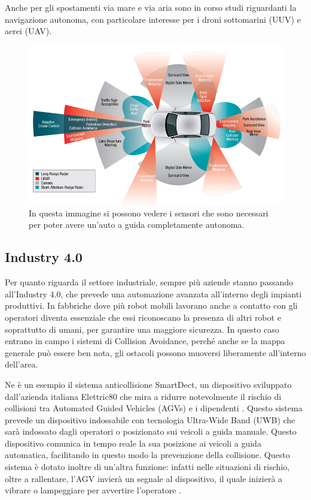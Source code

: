 \documentclass[Lau, binding=0.6cm, oneside]{sapthesis}
\begin{document}
Anche per gli spostamenti via mare e via aria sono in corso studi riguardanti la navigazione autonoma, con particolare interesse per i droni sottomarini (UUV) e aerei (UAV).

\begin{figure}[H]
    \centering
    \includegraphics[width=12.5cm]{driverless_car.png}
    \caption{In questa immagine si possono vedere i sensori che sono necessari per poter avere un'auto a guida completamente autonoma.}
    \label{fig:driverless_car}
\end{figure}

\subsection{Industry 4.0}
Per quanto riguarda il settore industriale, sempre più aziende stanno passando all'Industry 4.0, che prevede una automazione avanzata all'interno degli impianti produttivi.
In fabbriche dove più robot mobili lavorano anche a contatto con gli operatori diventa essenziale che essi riconoscano la presenza di altri robot e soprattutto di umani, per garantire una maggiore sicurezza.
In questo caso entrano in campo i sistemi di Collision Avoidance, perché anche se la mappa generale può essere ben nota, gli ostacoli possono muoversi liberamente all'interno dell'area.

Ne è un esempio il sistema anticollisione SmartDect, un dispositivo sviluppato dall'azienda italiana Elettric80 che mira a ridurre notevolmente il rischio di collisioni tra Automated Guided Vehicles (AGVs) e i dipendenti \cite{fonte9}.
Questo sistema prevede un dispositivo indossabile con tecnologia Ultra-Wide Band (UWB) che sarà indossato dagli operatori o posizionato sui veicoli a guida manuale.
Questo dispositivo comunica in tempo reale la sua posizione ai veicoli a guida automatica, facilitando in questo modo la prevenzione della collisione.
Questo sistema è dotato inoltre di un'altra funzione: infatti nelle situazioni di rischio, oltre a rallentare, l'AGV invierà un segnale al dispositivo, il quale inizierà a vibrare o lampeggiare per avvertire l'operatore \cite{fonte10}.
\end{document}
